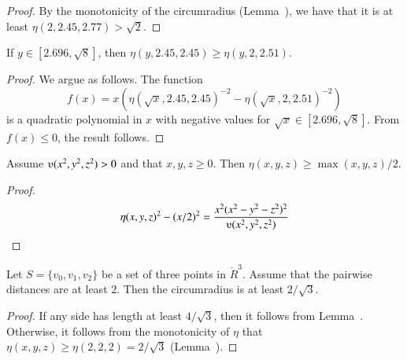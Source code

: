 \begin{proof}
By the monotonicity of the circumradius (Lemma~), 
we have
that it is at least $\eta(2,2.45,2.77) > \sqrt2$.
\end{proof}

\newpage

\begin{lemma}
If $y\in[2.696,\sqrt8]$, then
$\eta(y,2.45,2.45)\ge\eta(y,2,2.51)$.
\end{lemma}

\begin{proof}
We argue as follows. The function
  $$f(x) = x(\eta(\sqrt{x},2.45,2.45)^{-2}-\eta(\sqrt{x},2,2.51)^{-2})
  $$
is a quadratic
polynomial in $x$ with negative values for
$\sqrt{x}\in[2.696,\sqrt{8}]$. From $f(x)\le 0$, the result follows.
\end{proof}

\newpage

\begin{lemma}
Assume $\ups(x^2,y^2,z^2)>0$ and that $x,y,z\ge0$.  Then
$\eta(x,y,z)\ge \max(x,y,z)/2$.
\end{lemma}

\begin{proof} 
  $$\eta(x,y,z)^2 - (x/2)^2 =
  \frac{x^2 (x^2-y^2-z^2)^2}{\ups(x^2,y^2,z^2)}
  $$
\end{proof}



\begin{lemma}
Let $S=\{v_0,v_1,v_2\}$ be a set of three points in $\ring{R}^3$.
Assume that the pairwise distances are at least $2$.  Then
the circumradius is at least $2/\sqrt3$.
\end{lemma}

\begin{proof} If any side has length at least $4/\sqrt3$, then
it follows from Lemma~.  Otherwise, it
follows from the monotonicity of $\eta$ that
$\eta(x,y,z)\ge \eta(2,2,2) = 2/\sqrt3$ (Lemma~).
\end{proof}



\newpage








